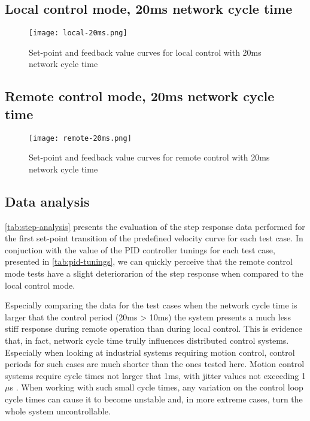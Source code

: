 \subsection*{Local control mode, 20ms network cycle time}
\begin{figure}[H]
	\centering
	\texttt{[image: local-20ms.png]}
	\caption{Set-point and feedback value curves for local control with 20ms network cycle time}
	\label{fig:local-20ms}
\end{figure}

\subsection*{Remote control mode, 20ms network cycle time}
\begin{figure}[H]
	\centering
	\texttt{[image: remote-20ms.png]}
	\caption{Set-point and feedback value curves for remote control with 20ms network cycle time}
	\label{fig:remote-20ms}
\end{figure}

\subsection{Data analysis}

\autoref{tab:step-analysis} presents the evaluation of the step response data performed for the first set-point transition of the predefined velocity curve for each test case.
In conjuction with the value of the PID controller tunings for each test case, presented in \autoref{tab:pid-tunings}, we can quickly perceive that the remote control mode tests have a slight deteriorarion of the step response when compared to the local control mode.

Especially comparing the data for the test cases when the network cycle time is larger that the control period (20ms > 10ms) the system presents a much less stiff response during remote operation than during local control.
This is evidence that, in fact, network cycle time trully influences distributed control systems.
Especially when looking at industrial systems requiring motion control, control periods for such cases are much shorter than the ones tested here.
Motion control systems require cycle times not larger that 1ms, with jitter values not exceeding 1$\mu$s \cite{rte:rte-for-automation}.
When working with such small cycle times, any variation on the control loop cycle times can cause it to become unstable and, in more extreme cases, turn the whole system uncontrollable.

